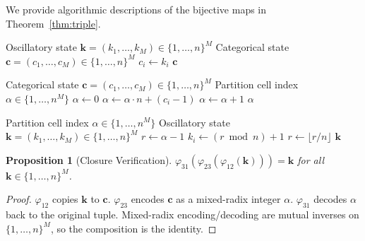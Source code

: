 \documentclass[11pt,twocolumn,a4paper]{article}
\newtheorem{proposition}[theorem]{Proposition}
\begin{document}
We provide algorithmic descriptions of the bijective maps in
Theorem~\ref{thm:triple}.

\begin{algorithm}[H]
\caption{$\varphi_{12}$: Oscillatory $\to$ Categorical}
\label{alg:phi12}
\begin{algorithmic}[1]
\Require Oscillatory state $\bm{k} = (k_1, \ldots, k_M) \in
  \{1,\ldots,n\}^M$
\Ensure Categorical state $\bm{c} = (c_1, \ldots, c_M) \in
  \{1,\ldots,n\}^M$
  \State $c_i \gets k_i$
\EndFor
\State \Return $\bm{c}$
\end{algorithmic}
\end{algorithm}

\begin{algorithm}[H]
\caption{$\varphi_{23}$: Categorical $\to$ Partitional}
\label{alg:phi23}
\begin{algorithmic}[1]
\Require Categorical state $\bm{c} = (c_1, \ldots, c_M) \in
  \{1,\ldots,n\}^M$
\Ensure Partition cell index $\alpha \in \{1,\ldots,n^M\}$
\State $\alpha \gets 0$
  \State $\alpha \gets \alpha \cdot n + (c_i - 1)$
\EndFor
\State $\alpha \gets \alpha + 1$
\State \Return $\alpha$
\end{algorithmic}
\end{algorithm}

\begin{algorithm}[H]
\caption{$\varphi_{31}$: Partitional $\to$ Oscillatory}
\label{alg:phi31}
\begin{algorithmic}[1]
\Require Partition cell index $\alpha \in \{1,\ldots,n^M\}$
\Ensure Oscillatory state $\bm{k} = (k_1, \ldots, k_M) \in
  \{1,\ldots,n\}^M$
\State $r \gets \alpha - 1$
  \State $k_i \gets (r \bmod n) + 1$
  \State $r \gets \lfloor r / n \rfloor$
\EndFor
\State \Return $\bm{k}$
\end{algorithmic}
\end{algorithm}

\begin{proposition}[Closure Verification]
$\varphi_{31}(\varphi_{23}(\varphi_{12}(\bm{k}))) = \bm{k}$ for
all $\bm{k} \in \{1,\ldots,n\}^M$.
\end{proposition}

\begin{proof}
$\varphi_{12}$ copies $\bm{k}$ to $\bm{c}$.
$\varphi_{23}$ encodes $\bm{c}$ as a mixed-radix integer $\alpha$.
$\varphi_{31}$ decodes $\alpha$ back to the original tuple.
Mixed-radix encoding/decoding are mutual inverses on
$\{1,\ldots,n\}^M$, so the composition is the identity.
\end{proof}
\end{document}
